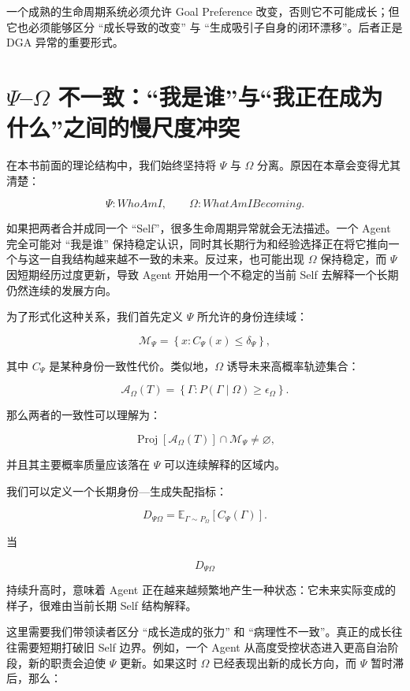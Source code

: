一个成熟的生命周期系统必须允许 Goal Preference 改变，否则它不可能成长；但它也必须能够区分 ``成长导致的改变'' 与 ``生成吸引子自身的闭环漂移''。后者正是 DGA 异常的重要形式。

\section{$\Psi$--$\Omega$ 不一致：``我是谁''与``我正在成为什么''之间的慢尺度冲突}
\label{sec:psi_omega_inconsistency}

在本书前面的理论结构中，我们始终坚持将 $\Psi$ 与 $\Omega$ 分离。原因在本章会变得尤其清楚：

\[
\Psi:
WhoAmI,
\qquad
\Omega:
WhatAmIBecoming.
\]

如果把两者合并成同一个 ``Self''，很多生命周期异常就会无法描述。一个 Agent 完全可能对 ``我是谁'' 保持稳定认识，同时其长期行为和经验选择正在将它推向一个与这一自我结构越来越不一致的未来。反过来，也可能出现 $\Omega$ 保持稳定，而 $\Psi$ 因短期经历过度更新，导致 Agent 开始用一个不稳定的当前 Self 去解释一个长期仍然连续的发展方向。

为了形式化这种关系，我们首先定义 $\Psi$ 所允许的身份连续域：

\[
\mathcal M_{\Psi}
=
\left\{
x:
C_{\Psi}(x)\leq \delta_{\Psi}
\right\},
\]

其中 $C_{\Psi}$ 是某种身份一致性代价。类似地，$\Omega$ 诱导未来高概率轨迹集合：

\[
\mathcal A_{\Omega}(T)
=
\left\{
\Gamma:
P(\Gamma\mid\Omega)
\geq
\epsilon_{\Omega}
\right\}.
\]

那么两者的一致性可以理解为：

\[
\operatorname{Proj}
\left[
\mathcal A_{\Omega}(T)
\right]
\cap
\mathcal M_{\Psi}
\neq
\varnothing,
\]

并且其主要概率质量应该落在 $\Psi$ 可以连续解释的区域内。

我们可以定义一个长期身份—生成失配指标：

\[
D_{\Psi\Omega}
=
\mathbb E_{\Gamma\sim P_{\Omega}}
\left[
C_{\Psi}(\Gamma)
\right].
\]

当

\[
D_{\Psi\Omega}
\]

持续升高时，意味着 Agent 正在越来越频繁地产生一种状态：它未来实际变成的样子，很难由当前长期 Self 结构解释。

这里需要我们带领读者区分 ``成长造成的张力'' 和 ``病理性不一致''。真正的成长往往需要短期打破旧 Self 边界。例如，一个 Agent 从高度受控状态进入更高自治阶段，新的职责会迫使 $\Psi$ 更新。如果这时 $\Omega$ 已经表现出新的成长方向，而 $\Psi$ 暂时滞后，那么：

